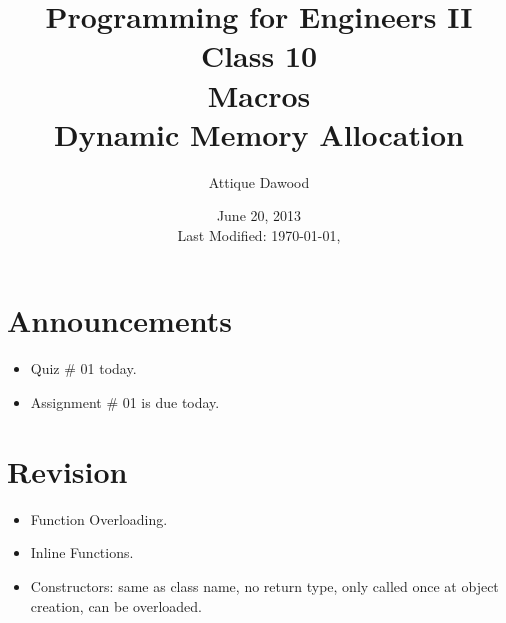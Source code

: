 \documentclass[12pt,a4paper]{article}
\title{\vspace{-2cm}Programming for Engineers II\\Class 10\\Macros\\Dynamic Memory Allocation}
\author{Attique Dawood}
\date{June 20, 2013\\[0.2cm] Last Modified: \today, \currenttime}
\begin{document}
\maketitle
\section{Announcements}
\begin{itemize}
\item Quiz \# 01 today.
\item Assignment \# 01 is due today.
\end{itemize}
\section{Revision}
\begin{itemize}
\item Function Overloading.
\item Inline Functions.
\item Constructors: same as class name, no return type, only called once at object creation, can be overloaded.
\end{itemize}
\end{document}
